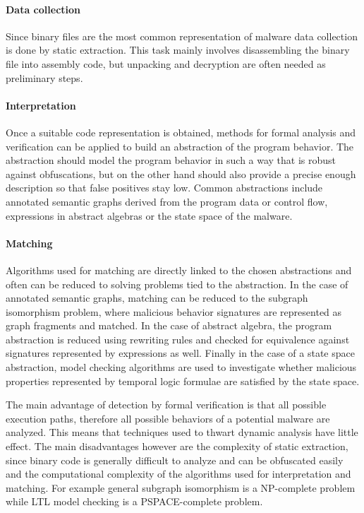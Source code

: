 \paragraph*{Data collection} Since binary files are the most common representation of malware data collection is done by static extraction. This task mainly involves disassembling the binary file into assembly code, but unpacking and decryption are often needed as preliminary steps.

\paragraph*{Interpretation} Once a suitable code representation is obtained, methods for formal analysis and verification can be applied to build an abstraction of the program behavior. The abstraction should model the program behavior in such a way that is robust against obfuscations, but on the other hand should also provide a precise enough description so that false positives stay low. Common abstractions include annotated semantic graphs derived from the program data or control flow, expressions in abstract algebras or the state space of the malware.

\paragraph*{Matching} Algorithms used for matching are directly linked to the chosen abstractions and often can be reduced to solving problems tied to the abstraction. In the case of annotated semantic graphs, matching can be reduced to the subgraph isomorphism problem, where malicious behavior signatures are represented as graph fragments and matched. In the case of abstract algebra, the program abstraction is reduced using rewriting rules and checked for equivalence against signatures represented by expressions as well. Finally in the case of a state space abstraction, model checking algorithms are used to investigate whether malicious properties represented by temporal logic formulae are satisfied by the state space.

The main advantage of detection by formal verification is that all possible execution paths, therefore all possible behaviors of a potential malware are analyzed. This means that techniques used to thwart dynamic analysis have little effect. The main disadvantages however are the complexity of static extraction, since binary code is generally difficult to analyze and can be obfuscated easily and the computational complexity of the algorithms used for interpretation and matching. For example general subgraph isomorphism is a NP-complete\cite{Garey79} problem while LTL model checking is a PSPACE-complete problem\cite{Sistla85}.

